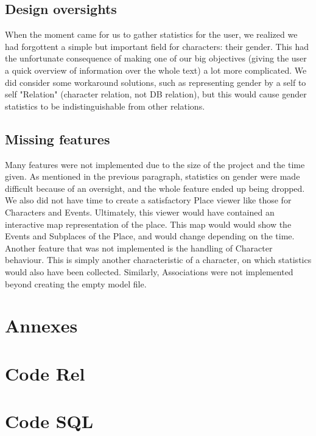 \documentclass[a4paper ,12pt,french]{article}
\begin{document}
\subsection{Design oversights}
When the moment came for us to gather statistics for the user, we realized we had forgottent a simple but important field for characters: their gender. This had the unfortunate consequence of making one of our big objectives (giving the user a quick overview of information over the whole text) a lot more complicated.
We did consider some workaround solutions, such as representing gender by a self to self "Relation" (character relation, not DB relation), but this would cause gender statistics to be indistinguishable from other relations.

\subsection{Missing features}
Many features were not implemented due to the size of the project and the time given. As mentioned in the previous paragraph, statistics on gender were made difficult because of an oversight, and the whole feature  ended up being dropped. We also did not have time to create a satisfactory Place viewer like those for Characters and Events. Ultimately, this viewer would have contained an interactive map representation of the place. This map would would show the Events and Subplaces of the Place, and would change depending on the time.
Another feature that was not implemented is the handling of Character behaviour. This is simply another characteristic of a character, on which statistics would also have been collected. Similarly, Associations were not implemented beyond creating the empty model file.

\newpage

\section*{Annexes}
\appendix

\section{Code Rel}

\newpage
\section{Code SQL}

\end{document}
